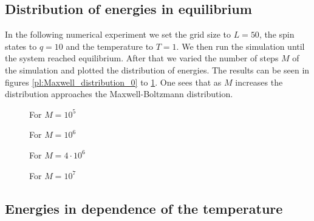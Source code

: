 \subsection{Distribution of energies in equilibrium}

In the following numerical experiment we set the grid size to $L=50$, the spin states to $q=10$ and the temperature to $T=1$. We then run the simulation until the system reached equilibrium. After that we varied the number of steps $M$ of the simulation and plotted the distribution of energies. The results can be seen in figures \ref{pl:Maxwell_distribution_0} to \ref{pl:Maxwell_distribution_3}. One sees that as $M$ increases the distribution approaches the Maxwell-Boltzmann distribution.

\begin{figure}
\begin{minipage}[b]{0.4\textwidth}
\centering

\vspace*{-0.5cm}
\caption{For $M=10^5$}
\label{pl:Maxwell_distribution_0}
\end{minipage}
\hfill
\begin{minipage}[b]{0.4\textwidth}
\centering

\vspace*{-0.5cm}
\caption{For $M=10^6$}
\label{pl:Maxwell_distribution_1}
\end{minipage}
\begin{minipage}[b]{0.4\textwidth}
\vspace*{1cm}
\centering

\vspace*{-0.5cm}
\caption{For $M=4\cdot10^6$}
\label{pl:Maxwell_distribution_2}
\end{minipage}
\hfill
\begin{minipage}[b]{0.4\textwidth}
\centering

\vspace*{-0.5cm}
\caption{For $M=10^7$}
\label{pl:Maxwell_distribution_3}
\end{minipage}
\end{figure}

\subsection*{Energies in dependence of the temperature}

